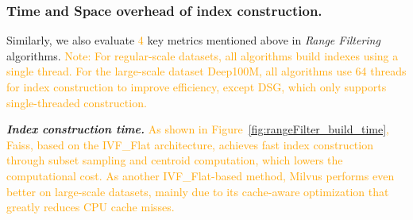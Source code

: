 \documentclass[sigconf, nonacm]{acmart}
\begin{document}
	\subsubsection{Time and Space overhead of index construction.}
	
	Similarly, we also evaluate \textcolor{orange}{4} key metrics mentioned above in \textit{Range Filtering} algorithms. \textcolor{orange}{Note: For regular-scale datasets, all algorithms build indexes using a single thread. For the large-scale dataset Deep100M, all algorithms use 64 threads for index construction to improve efficiency, except DSG, which only supports single-threaded construction.}
	
	\textit{\textbf{Index construction time.}}
%
%	
	\textcolor{orange}{
	As shown in Figure~\ref{fig:rangeFilter_build_time}, Faiss, based on the IVF\_Flat architecture, achieves fast index construction through subset sampling and centroid computation, which lowers the computational cost. 
	As another IVF\_Flat-based method, Milvus performs even better on large-scale datasets, mainly due to its cache-aware optimization that greatly reduces CPU cache misses.}
	
\end{document}
